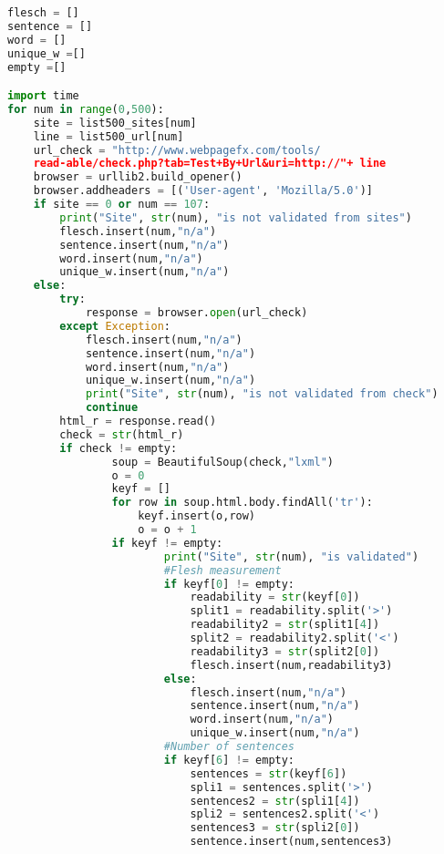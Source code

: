 \documentclass{article}
\begin{document}
\begin{lstlisting}[language=Python]
flesch = []
sentence = []
word = []
unique_w =[]
empty =[]

import time 
for num in range(0,500):
    site = list500_sites[num]
    line = list500_url[num] 
    url_check = "http://www.webpagefx.com/tools/
    read-able/check.php?tab=Test+By+Url&uri=http://"+ line
    browser = urllib2.build_opener()
    browser.addheaders = [('User-agent', 'Mozilla/5.0')]
    if site == 0 or num == 107:
        print("Site", str(num), "is not validated from sites")
        flesch.insert(num,"n/a")
        sentence.insert(num,"n/a")
        word.insert(num,"n/a")
        unique_w.insert(num,"n/a")  
    else:
        try:
            response = browser.open(url_check)
        except Exception: 
            flesch.insert(num,"n/a")
            sentence.insert(num,"n/a")
            word.insert(num,"n/a")
            unique_w.insert(num,"n/a")
            print("Site", str(num), "is not validated from check")
            continue        
        html_r = response.read()
        check = str(html_r)       
        if check != empty:                
                soup = BeautifulSoup(check,"lxml")
                o = 0
                keyf = []
                for row in soup.html.body.findAll('tr'):
                    keyf.insert(o,row)
                    o = o + 1
                if keyf != empty:                        
                        print("Site", str(num), "is validated")
                        #Flesh measurement
                        if keyf[0] != empty:
                            readability = str(keyf[0])
                            split1 = readability.split('>')
                            readability2 = str(split1[4])
                            split2 = readability2.split('<')
                            readability3 = str(split2[0])
                            flesch.insert(num,readability3)
                        else:
                            flesch.insert(num,"n/a")
                            sentence.insert(num,"n/a")
                            word.insert(num,"n/a")
                            unique_w.insert(num,"n/a")   
                        #Number of sentences   
                        if keyf[6] != empty:
                            sentences = str(keyf[6])
                            spli1 = sentences.split('>')
                            sentences2 = str(spli1[4])
                            spli2 = sentences2.split('<')
                            sentences3 = str(spli2[0])
                            sentence.insert(num,sentences3)

\end{lstlisting}
\end{document}
